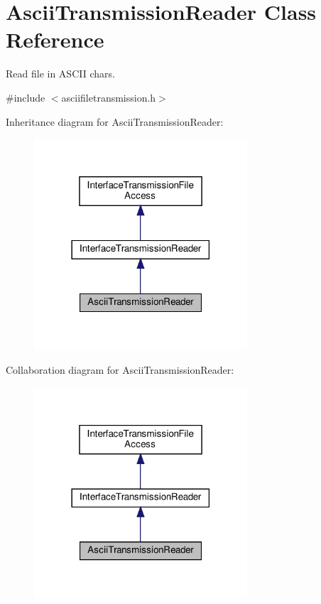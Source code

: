 \hypertarget{classAsciiTransmissionReader}{}\section{Ascii\+Transmission\+Reader Class Reference}
\label{classAsciiTransmissionReader}


Read file in A\+S\+C\+II chars.  




{\ttfamily \#include $<$asciifiletransmission.\+h$>$}



Inheritance diagram for Ascii\+Transmission\+Reader\+:\nopagebreak
\begin{figure}[H]
\begin{center}
\leavevmode
\includegraphics[width=225pt]{de/d54/classAsciiTransmissionReader__inherit__graph}
\end{center}
\end{figure}


Collaboration diagram for Ascii\+Transmission\+Reader\+:\nopagebreak
\begin{figure}[H]
\begin{center}
\leavevmode
\includegraphics[width=225pt]{d3/dac/classAsciiTransmissionReader__coll__graph}
\end{center}
\end{figure}
